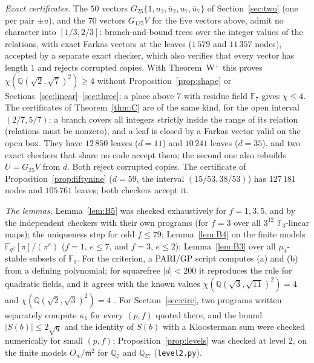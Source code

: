 \documentclass[11pt,a4paper]{amsart}
\theoremstyle{remark}
\newcommand{\Q}{\mathbb{Q}}
\newcommand{\F}{\mathbb{F}}
\begin{document}
\emph{Exact certificates.} The $50$ vectors $G_{25}\{1,u_2,\bar u_2,u_7,\bar u_7\}$ of
Section~\ref{sec:two} (one per pair $\pm u$), and the $70$ vectors $G_{125}V$ for the five vectors above, admit no
character into $[1/3,2/3]$: branch-and-bound trees over the integer values of the relations, with exact Farkas
vectors at the leaves ($1\,579$ and $11\,357$ nodes), accepted by a separate exact checker, which also verifies that
every vector has length $1$ and rejects corrupted copies. With Theorem~W$^+$ this proves
$\chi(\Q(\sqrt2,\sqrt7)^2)\ge4$ without Proposition~\ref{prop:shape} or Sections~\ref{sec:linear}--\ref{sec:three};
a place above $7$ with residue field $\F_7$ gives $\chi\le4$. The certificates of Theorem~\ref{thm:C} are of the
same kind, for the open interval $(2/7,5/7)$: a branch covers all integers strictly inside the range of its
relation (relations must be nonzero), and a leaf is closed by a Farkas vector valid on the open box. They have
$12\,850$ leaves ($d=11$) and $10\,241$ leaves ($d=35$), and two exact checkers that share no code accept them; the
second one also rebuilds $U=G_{25}V$ from $d$. Both reject corrupted copies. The certificate of
Proposition~\ref{prop:fiftynine} ($d=59$, the interval $(15/53,38/53)$) has $127\,181$ nodes and $105\,761$ leaves;
both checkers accept it.

\emph{The lemmas.} Lemma~\ref{lem:B5} was checked exhaustively for $f=1,3,5$, and by the independent checkers with their
own programs (for $f=3$ over all $3^{12}$ $\F_3$-linear maps); the uniqueness step for odd $f\le79$; Lemma~\ref{lem:B4}
on the finite models $\F_{q^2}[\pi]/(\pi^e)$ ($f=1$, $e\le7$, and $f=3$, $e\le2$); Lemma~\ref{lem:B3} over all
$\mu_4$-stable subsets of $\F_9$. For the criterion, a PARI/GP script computes (a) and (b) from a defining
polynomial; for squarefree $|d|<200$ it reproduces the rule for quadratic fields, and it agrees with the known values
$\chi(\Q(\sqrt3,\sqrt{11})^2)=4$ \cite{Fischer1994,MM} and $\chi(\Q(\sqrt2,\sqrt3)^2)=4$ \cite[Theorem~1]{P4C}. For
Section~\ref{sec:circ}, two programs written separately compute $\kappa_1$ for every $(p,f)$ quoted there, and the
bound $|S(b)|\le2\sqrt q$ and the identity of $S(b)$ with a Kloosterman sum were checked numerically for small
$(p,f)$; Proposition~\ref{prop:levels} was checked at level $2$, on the finite models $O_w/\mathfrak m^2$ for $\Q_7$ and
$\Q_{27}$ (\nolinkurl{level2.py}).
\end{document}

